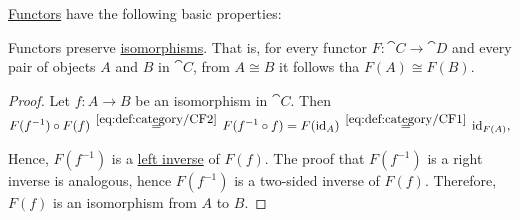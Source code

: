 \begin{proposition}\label{thm:def:functor/properties}
  \hyperref[def:functor]{Functors} have the following basic properties:
  \begin{thmenum}
     Functors preserve \hyperref[def:morphism_invertibility/isomorphism]{isomorphisms}. That is, for every functor \( F: \cat{C} \to \cat{D} \) and every pair of objects \( A \) and \( B \) in \( \cat{C} \), from \( A \cong B \) it follows tha \( F(A) \cong F(B) \).
  \end{thmenum}
\end{proposition}
\begin{proof}
   Let \( f: A \to B \) be an isomorphism in \( \cat{C} \). Then
  \begin{equation}\label{eq:thm:def:functor/properties/isomorphisms}
    F(f^{-1}) \bincirc F(f)
    \reloset {\eqref{eq:def:category/CF2}} =
    F(f^{-1} \bincirc f)
    =
    F(\id_A)
    \reloset {\eqref{eq:def:category/CF1}} =
    \id_{F(A)},
  \end{equation}

  Hence, \( F(f^{-1}) \) is a \hyperref[morphism_invertibility/left_invertible]{left inverse} of \( F(f) \). The proof that \( F(f^{-1}) \) is a right inverse is analogous, hence \( F(f^{-1}) \) is a two-sided inverse of \( F(f) \). Therefore, \( F(f) \) is an isomorphism from \( A \) to \( B \).
\end{proof}

